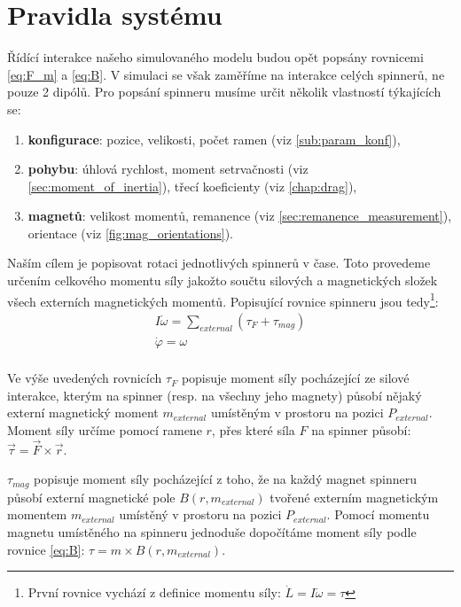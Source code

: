\section{Pravidla systému}
Řídící interakce našeho simulovaného modelu budou opět popsány rovnicemi \ref{eq:F_m} a \ref{eq:B}. V simulaci se však zaměříme na interakce celých spinnerů, ne pouze 2 dipólů. Pro popsání spinneru musíme určit několik vlastností týkajících se:
\begin{enumerate}[topsep=0pt, partopsep=0pt]
    \setlength{\itemsep}{0pt}%
    \setlength{\parskip}{0pt}%
    \item \textbf{konfigurace}: pozice, velikosti, počet ramen (viz \autoref{sub:param_konf}),
    \item \textbf{pohybu}: úhlová rychlost, moment setrvačnosti (viz \autoref{sec:moment_of_inertia}), třecí koeficienty (viz \autoref{chap:drag}),
    \item \textbf{magnetů}: velikost momentů, remanence (viz \autoref{sec:remanence_measurement}), orientace (viz \autoref{fig:mag_orientations}).
\end{enumerate}

Naším cílem je popisovat rotaci jednotlivých spinnerů v čase. Toto provedeme určením celkového momentu síly jakožto součtu silových a magnetických složek všech externích magnetických momentů. Popisující rovnice spinneru jsou tedy\footnote{První rovnice vychází z definice momentu síly: $\dot{L} = I \dot{\omega} = \tau$}:
\begin{equation}
    \label{eq:sim_equations}
    \begin{gathered}
        I\dot{\omega} = \sum_{external} (\tau_F + \tau_{mag}) \\
        \dot{\varphi} = \omega \\
    \end{gathered}
\end{equation}

Ve výše uvedených rovnicích $\tau_F$ popisuje moment síly pocházející ze silové interakce, kterým na spinner (resp. na všechny jeho magnety) působí nějaký externí magnetický moment $m_{external}$ umístěným v prostoru na pozici $P_{external}$. Moment síly určíme pomocí ramene $r$, přes které síla $F$ na spinner působí: $\vec{\tau} = \vec{F} \times \vec{r}$.

$\tau_{mag}$ popisuje moment síly pocházející z toho, že na každý magnet spinneru působí externí magnetické pole $B(r, m_{external})$ tvořené externím magnetickým momentem $m_{external}$ umístěný v prostoru na pozici $P_{external}$. Pomocí momentu magnetu umístěného na spinneru jednoduše dopočítáme moment síly podle rovnice \ref{eq:B}: $\tau = m \times B(r, m_{external})$.

